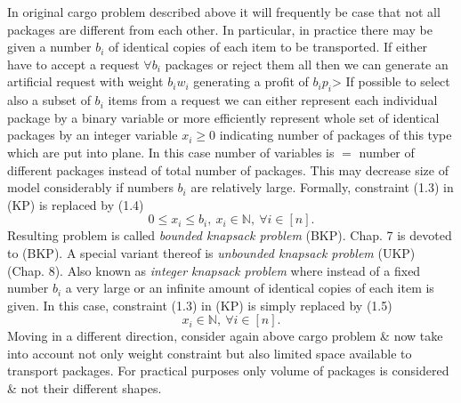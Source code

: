 \documentclass{article}
\begin{document}
\begin{itemize}
\begin{itemize}
        In original cargo problem described above it will frequently be case that not all packages are different from each other. In particular, in practice there may be given a number $b_i$ of identical copies of each item to be transported. If either have to accept a request $\forall b_i$ packages or reject them all then we can generate an artificial request with weight $b_iw_i$ generating a profit of $b_ip_i$> If possible to select also a subset of $b_i$ items from a request we can either represent each individual package by a binary variable or more efficiently represent whole set of identical packages by an integer variable $x_i\ge0$ indicating number of packages of this type which are put into plane. In this case number of variables is $=$ number of different packages instead of total number of packages. This may decrease size of model considerably if numbers $b_i$ are relatively large. Formally, constraint (1.3) in (KP) is replaced by (1.4)
        \begin{equation*}
            0\le x_i\le b_i,\ x_i\in\mathbb{N},\ \forall i\in[n].
        \end{equation*}
        Resulting problem is called {\it bounded knapsack problem} (BKP). Chap. 7 is devoted to (BKP). A special variant thereof is {\it unbounded knapsack problem} (UKP) (Chap. 8). Also known as {\it integer knapsack problem} where instead of a fixed number $b_i$ a very large or an infinite amount of identical copies of each item is given. In this case, constraint (1.3) in (KP) is simply replaced by (1.5)
        \begin{equation*}
            x_i\in\mathbb{N},\ \forall i\in[n].
        \end{equation*}
        Moving in a different direction, consider again above cargo problem \& now take into account not only weight constraint but also limited space available to transport packages. For practical purposes only volume of packages is considered \& not their different shapes.


\end{itemize}
\end{itemize}
\end{document}
